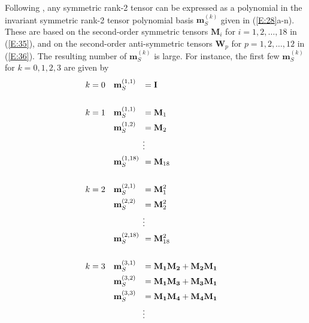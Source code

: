 Following , any symmetric rank-2 tensor can be expressed as a polynomial in the invariant symmetric rank-2 tensor polynomial basis  $\mathbf{m}^{(k)}_S$ given in (\ref{E:28}a-n).  These are based on the second-order symmetric tensors  $\mathbf{M}_i$ for $ i =1,2, \ldots ,18$ in (\ref{E:35}), and on the second-order anti-symmetric tensors $\mathbf{W}_p$  for $p =1,2, \ldots ,12$  in (\ref{E:36}).  The resulting number of $\mathbf{m}^{(k)}_S$ is large.  For instance, the first few  $\mathbf{m}^{(k)}_S$ for $k = 0, 1, 2, 3$ are given by 
%
\begin{subequations}
\label{E:38}
\begin{align}
	k &= 0  & \mathmakebox[\widthof{$\mathbf{m}^{(3,153)}_S$}][l]{\mathbf{m}^{(1,1)}_S}   &= \mathbf{I} 				&   			\\[15pt]
	k &= 1  & \mathmakebox[\widthof{$\mathbf{m}^{(3,153)}_S$}][l]{\mathbf{m}^{(1,1)}_S}   &= \mathbf{M}_1 			&   			\\
	  &     & \mathmakebox[\widthof{$\mathbf{m}^{(3,153)}_S$}][l]{\mathbf{m}^{(1,2)}_S}   &= \mathbf{M}_2 			&   			\\
	  &	    &    				     &  \vdots  &   \notag 						\\
	  &     & \mathmakebox[\widthof{$\mathbf{m}^{(3,153)}_S$}][l]{\mathbf{m}^{(1,18)}_S}  &= \mathbf{M}_{18} 		& 				\\[15pt]
	k &= 2  & \mathmakebox[\widthof{$\mathbf{m}^{(3,153)}_S$}][l]{\mathbf{m}^{(2,1)}_S}   &= \mathbf{M}^2_1 			&   			\\  
	  &  	& \mathmakebox[\widthof{$\mathbf{m}^{(3,153)}_S$}][l]{\mathbf{m}^{(2,2)}_S}   &= \mathbf{M}^2_2 			& 				\\
	  &     &  						 &  \vdots 	& 	\notag 						\\ 
	  &     & \mathmakebox[\widthof{$\mathbf{m}^{(3,153)}_S$}][l]{\mathbf{m}^{(2,18)}_S}  &= \mathbf{M}^2_{18} 		& 				\\[15pt]   
	k &= 3  & \mathmakebox[\widthof{$\mathbf{m}^{(3,153)}_S$}][l]{\mathbf{m}^{(3,1)}_S}   &= \mathbf{M_1M_2} + \mathbf{M_2M_1}  &   	\\  
	  &  	& \mathmakebox[\widthof{$\mathbf{m}^{(3,153)}_S$}][l]{\mathbf{m}^{(3,2)}_S}   &= \mathbf{M_1M_3} + \mathbf{M_3M_1}  &   	\\  
	  &  	& \mathmakebox[\widthof{$\mathbf{m}^{(3,153)}_S$}][l]{\mathbf{m}^{(3,3)}_S}   &= \mathbf{M_1M_4} + \mathbf{M_4M_1}  &   	\\  
	  &     &  						 &  \vdots 	& 	\notag \\ 

\end{align}
\end{subequations}
